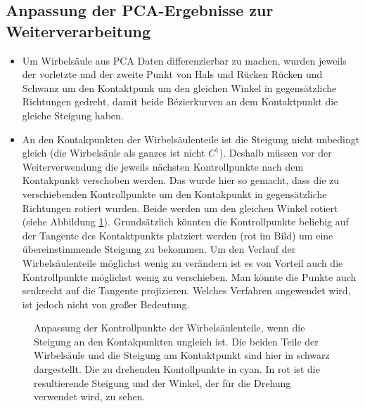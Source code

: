 \subsection{Anpassung der PCA-Ergebnisse zur Weiterverarbeitung}

\begin{itemize}
 \item Um Wirbelsäule aus PCA Daten differenzierbar zu machen, wurden jeweils der vorletzte und der zweite Punkt von Hals und Rücken \bzw Rücken und Schwanz um den Kontaktpunk um den gleichen Winkel in gegensätzliche Richtungen gedreht, damit beide Bézierkurven an dem Kontaktpunkt die gleiche Steigung haben. 
 \item An den Kontakpunkten der Wirbelsäulenteile ist die Steigung nicht unbedingt gleich (die Wirbelsäule als ganzes ist nicht $C^1$). Deshalb müssen vor der Weiterverwendung die jeweils nächsten Kontrollpunkte nach dem Kontakpunkt verschoben werden. Das wurde hier so gemacht, dass die zu verschiebenden Kontrollpunkte um den Kontakpunkt in gegensätzliche Richtungen rotiert wurden. Beide werden um den gleichen Winkel rotiert (siehe Abbildung \ref{smooth_spine}). Grundsätzlich könnten die Kontrollpunkte beliebig auf der Tangente des Kontaktpunkts platziert werden (rot im Bild) um eine übereinstimmende Steigung zu bekommen. Um den Verlauf der Wirbelsäulenteile möglichst wenig zu verändern ist es von Vorteil auch die Kontrollpunkte möglichst wenig zu verschieben. Man könnte die Punkte \zb auch senkrecht auf die Tangente projizieren. Welches Verfahren angewendet wird, ist jedoch nicht von großer Bedeutung. 
\end{itemize}

\begin{figure}
 \qquad
 \caption{Anpassung der Kontrollpunkte der Wirbelsäulenteile, wenn die Steigung an den Kontakpunkten ungleich ist. Die beiden Teile der Wirbelsäule und die Steigung am Kontaktpunkt sind hier in schwarz dargestellt. Die zu drehenden Kontollpunkte in cyan. In rot ist die resultierende Steigung und der Winkel, der für die Drehung verwendet wird, zu sehen.}
 \label{smooth_spine}
\end{figure}


